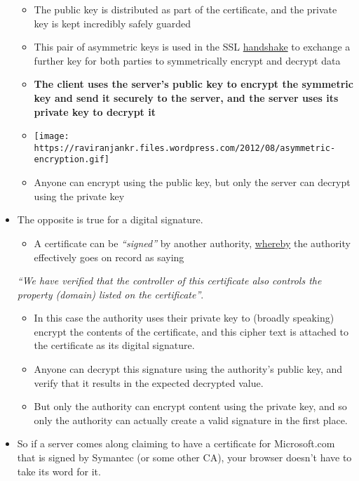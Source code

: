 \begin{itemize}
  \begin{itemize}
  \itemsep1pt\parskip0pt
  \item
    The public key is distributed as part of the certificate, and the
    private key is kept incredibly safely guarded
  \item
    This pair of asymmetric keys is used in the SSL
    \href{http://www.dictionary.com/browse/handshake}{handshake} to
    exchange a further key for both parties to symmetrically encrypt and
    decrypt data
  \item
    \textbf{The client uses the server's public key to encrypt the
    symmetric key and send it securely to the server, and the server
    uses its private key to decrypt it}
  \item
    \texttt{[image: https://raviranjankr.files.wordpress.com/2012/08/asymmetric-encryption.gif]}
  \item
    Anyone can encrypt using the public key, but only the server can
    decrypt using the private key
  \end{itemize}
\item
  The opposite is true for a digital signature.

  \begin{itemize}
  \itemsep1pt\parskip0pt
  \item
    A certificate can be \emph{``signed''} by another authority,
    \href{https://www.google.es/webhp?sourceid=chrome-instant\&ion=1\&espv=2\&ie=UTF-8\#q=define\%20whereby}{whereby}
    the authority effectively goes on record as saying
  \end{itemize}

  \emph{``We have verified that the controller of this certificate also
  controls the property (domain) listed on the certificate''}.

  \begin{itemize}
  \itemsep1pt\parskip0pt
  \item
    In this case the authority uses their private key to (broadly
    speaking) encrypt the contents of the certificate, and this cipher
    text is attached to the certificate as its digital signature.
  \item
    Anyone can decrypt this signature using the authority's public key,
    and verify that it results in the expected decrypted value.
  \item
    But only the authority can encrypt content using the private key,
    and so only the authority can actually create a valid signature in
    the first place.
  \end{itemize}
\item
  So if a server comes along claiming to have a certificate for
  Microsoft.com that is signed by Symantec (or some other CA), your
  browser doesn't have to take its word for it.


\end{itemize}
